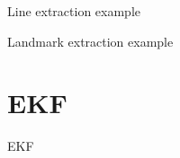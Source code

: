 \documentclass[xcolor=dvipsnames]{beamer}
\begin{document}
  {
  \begin{frame}{Line extraction example}
  \end{frame}
  }

  {
  \begin{frame}{Landmark extraction example}
  \end{frame}
  }

  \section{EKF}
  \begin{frame}{EKF}
    
  \end{frame}
\end{document}

